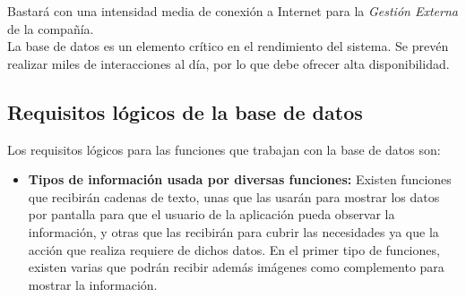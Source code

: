 \documentclass[11pt, a4paper, twoside]{report}
\begin{document}
			Bastará con una intensidad media de conexión a Internet para la \textit{Gestión Externa} de la compañía.\\

			La base de datos es un elemento crítico en el rendimiento del sistema. Se prevén realizar miles de interacciones al día, por lo que debe ofrecer alta disponibilidad.

		\subsection{Requisitos lógicos de la base de datos}
			Los requisitos lógicos para las funciones que trabajan con la base de datos son:
			\begin{itemize}
				\item \textbf{Tipos de información usada por diversas funciones: }
				Existen funciones que recibirán cadenas de texto, unas que las usarán para mostrar los datos por pantalla para que el usuario de la aplicación pueda observar la información, y otras que las recibirán para cubrir las necesidades ya que la acción que realiza requiere de dichos datos. En el primer tipo de funciones, existen varias que podrán recibir además imágenes como complemento para mostrar la información. \\ 
				

\end{itemize}
\end{document}
